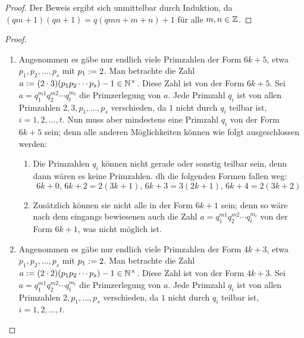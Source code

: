 \begin{proof}
  Der Beweis ergibt sich unmittelbar durch Induktion, da
  $(qm + 1)(qn + 1) = q(qmn + m + n) + 1$ für alle $m,n \in \mathbb{Z}$.
\end{proof}
\begin{proof}
  \begin{enumerate}[label=\alph*)]
    \item Angenommen es gäbe nur endlich viele Primzahlen der Form $6k + 5$,
          etwa $p_1,p_2,\dotsc,p_s$ mit $p_1 := 2$.
          Man betrachte die Zahl $a := (2 \cdot 3)(p_1p_2 \dotsm p_s) - 1
            \in \mathbb{N}^\times$. Diese Zahl ist von der Form $6k + 5$.
          Sei $a = q_1^{m1}q_2^{m2} \dotsm q_t^{m_t}$ die Primzerlegung von $a$.
          Jede Primzahl $q_i$ ist von allen Primzahlen $2,3,p_1,\dotsc,p_s$
          verschieden, da $1$ nicht durch $q_i$ teilbar ist, $i = 1,2,\dots,t$.
          Nun muss aber mindestens eine Primzahl $q_i$ von der Form $6k + 5$ sein;
          denn alle anderen Möglichkeiten können wie folgt ausgeschlossen werden:
          \begin{enumerate}
            \item Die Primzahlen $q_i$ können nicht gerade oder
                  sonstig teilbar sein,
                  denn dann wären es keine Primzahlen.
                  \Ac{dh} die folgenden Formen fallen weg:
                  \begin{equation*}
                    6k + 0,\, 6k + 2 = 2(3k + 1),\, 6k + 3 = 3(2k + 1),\,
                    6k + 4 = 2(3k + 2)
                  \end{equation*}
            \item Zusätzlich können sie nicht alle in der Form $6k + 1$ sein; denn
                  so wäre nach dem eingangs bewiesenen auch die Zahl
                  $a = q_1^{m1}q_2^{m2} \dotsm q_t^{m_t}$ von
                  der Form $6k + 1$, was nicht möglich ist.
          \end{enumerate}
    \item Angenommen es gäbe nur endlich viele Primzahlen der Form $4k + 3$,
          etwa $p_1,p_2,\dotsc,p_s$ mit $p_1 := 2$.
          Man betrachte die Zahl $a := (2 \cdot 2)(p_1p_2 \dotsm p_s) - 1
            \in \mathbb{N}^\times$. Diese Zahl ist von der Form $4k + 3$.
          Sei $a = q_1^{m1}q_2^{m2} \dotsm q_t^{m_t}$ die Primzerlegung von $a$.
          Jede Primzahl $q_i$ ist von allen Primzahlen $2,p_1,\dotsc,p_s$
          verschieden, da $1$ nicht durch $q_i$ teilbar ist, $i = 1,2,\dots,t$.

\end{enumerate}
\end{proof}
